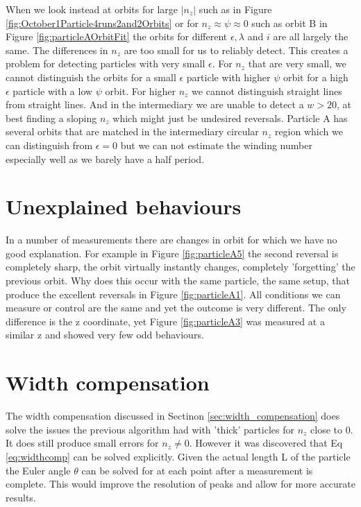 When we look instead at orbits for large $\left| n_z \right|$ such as in Figure 
\ref{fig:October1Particle4runs2and2Orbits} or for $n_z \approx \psi \approx 0$ such as orbit B in Figure 
\ref{fig:particleAOrbitFit} the orbits for different $\epsilon, \lambda$ 
and $i$ are all largely the same. The differences in $n_z$ are too small for us to reliably detect. This creates a problem for 
detecting particles with very small $\epsilon$. For $n_z$ that are very small, we cannot distinguish the orbits for a 
small $\epsilon$ particle with higher $\psi$ orbit for a high $\epsilon$ particle with a low $\psi$ orbit. For higher 
$n_z$ we cannot distinguish straight lines from straight lines. And in the intermediary we are unable to detect a $w 
> 20$, at best finding a sloping $n_z$ which might just be undesired reversals. Particle A has several orbits that 
are matched in the intermediary circular $n_z$ region which we can distinguish from $\epsilon = 0$ but we can not 
estimate the winding number especially well as we barely have a half period. 


\section{Unexplained behaviours}
In a number of measurements there are changes in orbit for which we have no good explanation. For example in Figure \ref{fig:particleA5} the second reversal is completely sharp, the orbit virtually instantly changes, completely 'forgetting' the previous orbit. Why does this occur with the same particle, the same setup, that produce the excellent reversals in Figure \ref{fig:particleA1}. All conditions we can measure or control are the same and yet the outcome is very different. The only difference is the z coordinate, yet Figure \ref{fig:particleA3} was measured at a similar z and showed very few odd behaviours. 

\section{Width compensation}
The width compensation discussed in Sectinon \ref{sec:width_compensation} does solve the issues the previous algorithm had with 'thick' particles for $n_z$ close to 0. It does still produce small errors for $n_z \neq 0$. However it was discovered that Eq \ref{eq:widthcomp} can be solved explicitly. Given the actual length L of the particle the Euler angle $\theta$ can be solved for at each point after a measurement is complete. This would improve the resolution of peaks and allow for more accurate results.
